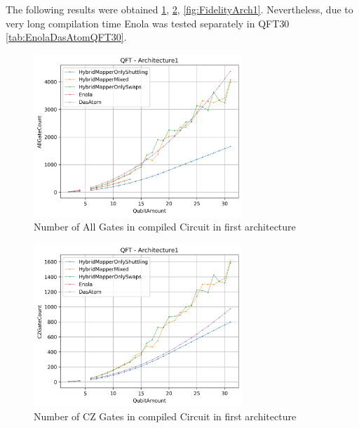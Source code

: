 The following results were obtained \ref{fig:AllGateCountArch1},
\ref{fig:CZGateCountArch1}, \ref{fig:FidelityArch1}. 
Nevertheless, due to very long compilation time Enola was tested separately in \ac{QFT}30 \ref{tab:EnolaDasAtomQFT30}.
\begin{figure}[htbp]
  \centering
    \includegraphics[width=0.7\textwidth]{figures/AllGateCountArch1.png}
    \caption[All Gate Number of first Architecture]{Number of All Gates in compiled Circuit in first architecture}
    \label{fig:AllGateCountArch1}
\end{figure}
\begin{figure}[htbp]
  \centering
    \includegraphics[width=0.7\textwidth]{figures/CZGateCountArch1.png}
    \caption[CZ Gate Number for first Architecture]{Number of CZ Gates in compiled Circuit in first architecture}
    \label{fig:CZGateCountArch1}
\end{figure}

